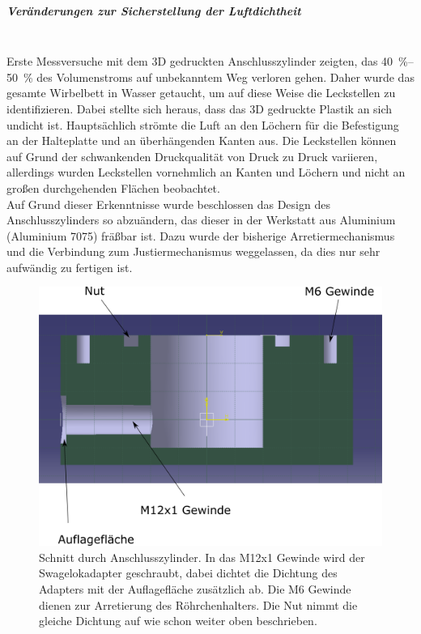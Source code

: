 \subparagraph{Veränderungen zur Sicherstellung der Luftdichtheit}
\hfill \\

Erste Messversuche mit dem 3D gedruckten Anschlusszylinder zeigten, das \SIrange{40}{50}{\%} des Volumenstroms auf unbekanntem Weg verloren gehen. Daher wurde das gesamte Wirbelbett in Wasser getaucht, um auf diese Weise die Leckstellen zu identifizieren. Dabei stellte sich heraus, dass das 3D gedruckte Plastik an sich undicht ist. Hauptsächlich strömte die Luft an den Löchern für die Befestigung an der Halteplatte und an überhängenden Kanten aus. Die Leckstellen können auf Grund der schwankenden Druckqualität von Druck zu Druck variieren, allerdings wurden Leckstellen vornehmlich an Kanten und Löchern und nicht an großen durchgehenden Flächen beobachtet. \\
Auf Grund dieser Erkenntnisse wurde beschlossen das Design des Anschlusszylinders so abzuändern, das dieser in der Werkstatt aus Aluminium (Aluminium 7075) fräßbar ist. Dazu wurde der bisherige Arretiermechanismus und die Verbindung zum Justiermechanismus weggelassen, da dies nur sehr aufwändig zu fertigen ist.


\begin{figure}[h!]
	\begin{center}
		\includegraphics[scale=0.5]{Schnitt_AnschlusszylinderV2.png}
		\caption[Schnitt Zylinder V2]{Schnitt durch Anschlusszylinder. In das M12x1 Gewinde wird der Swagelokadapter geschraubt, dabei dichtet die Dichtung des Adapters mit der Auflagefläche zusätzlich ab. Die M6 Gewinde dienen zur Arretierung des Röhrchenhalters. Die Nut nimmt die gleiche Dichtung auf wie schon weiter oben beschrieben.}
	\end{center}
\end{figure}


